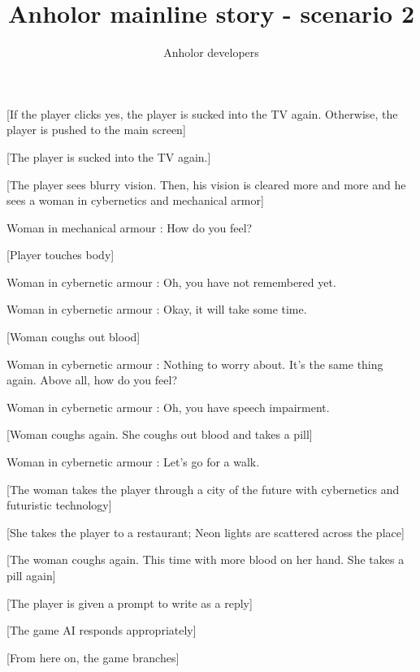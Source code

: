 \documentclass[a4paper,12pt]{article}
\author {Anholor developers}
\title {Anholor mainline story - scenario 2}
\begin{document}
\newline
[Continue?]\newline
[Yes/No?]\newline

[If the player clicks yes, the player is sucked into the TV again. Otherwise, the player is pushed to the main screen]\newline

[The player is sucked into the TV again.]\newline

[The player sees blurry vision. Then, his vision is cleared more and more and he sees a woman in cybernetics and mechanical armor]\newline

Woman in mechanical armour : How do you feel?\newline

[Player touches body]\newline

Woman in cybernetic armour : Oh, you have not remembered yet.\newline

Woman in cybernetic armour : Okay, it will take some time.\newline

[Woman coughs out blood]\newline

Woman in cybernetic armour : Nothing to worry about. It's the same thing again. Above all, how do you feel? \newline

Woman in cybernetic armour : Oh, you have speech impairment.\newline

[Woman coughs again. She coughs out blood and takes a pill]\newline

Woman in cybernetic armour : Let's go for a walk.\newline

[The woman takes the player through a city of the future with cybernetics and futuristic technology]\newline

[She takes the player to a restaurant; Neon lights are scattered across the place]\newline

[The woman coughs again. This time with more blood on her hand. She takes a pill again]\newline

[The player is given a prompt to write as a reply]\newline

[The game AI responds appropriately]\newline

[From here on, the game branches]\newline
\end{document}

